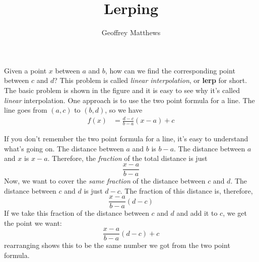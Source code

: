\documentclass[11pt]{article}
\title{Lerping}
\author{Geoffrey Matthews}
\begin{document}

\maketitle

\begin{center}
\end{center}

Given a point $x$ between $a$ and $b$,
how can we find the corresponding point between $c$ and $d$?
This problem is called {\em linear interpolation}, or {\bf lerp}
for short.  The basic problem is shown in the figure
and it is easy to see why it's called {\em linear} interpolation.
One approach is to use the two point formula for a line.
The line goes from $(a,c)$ to $(b,d)$, so we have
\begin{align*}
f(x) &= \frac{d-c}{b-a}(x-a) + c
\end{align*}

If you don't remember the two point formula for a line,
it's easy to understand what's going on.  The distance between
$a$ and $b$ is $b-a$.  The distance between $a$ and $x$
is $x-a$.  Therefore, the {\em fraction} of the total distance
is just
\[
\frac{x-a}{b-a}
\]
Now, we want to cover the {\em same fraction} of 
the distance between $c$ and $d$.  The distance
between $c$ and $d$ is just $d-c$.  The fraction of
this distance is, therefore,
\[
\frac{x-a}{b-a}(d-c)
\]
If we take this fraction of the distance between
$c$ and $d$ and add it to $c$, we get the
point we want:
\[
\frac{x-a}{b-a}(d-c) + c
\]
rearranging shows this to be the same number we got from
the two point formula.
\end{document}
